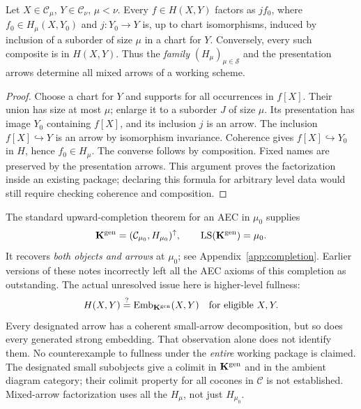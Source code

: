 \begin{proposition}
\label{prop:mixed-factorization}
Let $X\in\mathcal C_\mu$, $Y\in\mathcal C_\nu$, $\mu<\nu$.
Every $f\in H(X,Y)$ factors as $j f_0$, where
$f_0\in H_\mu(X,Y_0)$ and $j:Y_0\to Y$ is, up to chart
isomorphisms, induced by inclusion of a suborder of size $\mu$ in a
chart for $Y$. Conversely, every such composite is in $H(X,Y)$.
Thus the \emph{family} $(H_\mu)_{\mu\in\mathcal S}$ and the presentation
arrows determine all mixed arrows of a working scheme.
\end{proposition}
\begin{proof}
Choose a chart for $Y$ and supports for all occurrences in $f[X]$.
Their union has size at most $\mu$; enlarge it to a suborder $J$ of size
$\mu$. Its presentation has image $Y_0$ containing $f[X]$, and its
inclusion $j$ is an arrow. The inclusion $f[X]\hookrightarrow Y$
is an arrow by isomorphism invariance. Coherence gives
$f[X]\hookrightarrow Y_0$ in $H$, hence $f_0\in H_\mu$.
The converse follows by composition. Fixed names are preserved by the
presentation arrows. This argument proves the factorization inside an
existing package; declaring this formula for arbitrary level data would
still require checking coherence and composition.
\end{proof}

\begin{remark}
\label{rem:background-aec-generated}
The standard upward-completion theorem for an AEC in $\mu_0$ supplies
\[
 \mathbf K^{\mathrm{gen}}=(\mathcal C_{\mu_0},H_{\mu_0})^{\uparrow},
 \qquad \operatorname{LS}(\mathbf K^{\mathrm{gen}})=\mu_0.
\]
It recovers \emph{both objects and arrows} at $\mu_0$; see
Appendix~\ref{app:completion}. Earlier versions of these notes incorrectly
left all the AEC axioms of this completion as outstanding. The actual
unresolved issue here is higher-level fullness:
\[
 H(X,Y)\stackrel{?}{=}
 \operatorname{Emb}_{\mathbf K^{\mathrm{gen}}}(X,Y)
 \quad\text{for eligible }X,Y.
\]
Every designated arrow has a coherent small-arrow decomposition, but so
does every generated strong embedding. That observation alone does not
identify them. No counterexample to fullness under the \emph{entire}
working package is claimed. The designated small subobjects give a
colimit in $\mathbf K^{\mathrm{gen}}$ and in the ambient diagram category;
their colimit property for all cocones in $\mathcal C$ is not established.
Mixed-arrow factorization uses all the $H_\mu$, not just $H_{\mu_0}$.
\end{remark}

